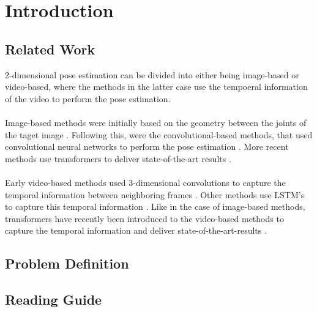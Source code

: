 \documentclass[./main.tex]{subfiles}
\begin{document}
\section{Introduction}

\subsection{Related Work}
2-dimensional pose estimation can be divided into either being image-based or video-based, where the methods in the latter case use the tempoeral information of the video to perform the pose estimation. 
\\
\\
Image-based methods were initially based on the geometry between the joints of the taget image \cite{6618926, 10.1007/978-3-642-33715-4_19, 6380498}. Following this, were the convolutional-based methods, that used convolutional neural networks \cite{lecun1995convolutional} to perform the pose estimation \cite{https://doi.org/10.48550/arxiv.1602.00134, https://doi.org/10.48550/arxiv.1603.06937, https://doi.org/10.48550/arxiv.1812.08008, https://doi.org/10.48550/arxiv.1703.06870}. More recent methods use transformers \cite{https://doi.org/10.48550/arxiv.1706.03762} to deliver state-of-the-art results \cite{https://doi.org/10.48550/arxiv.2204.12484, https://doi.org/10.48550/arxiv.2012.14214}.
\\
\\
Early video-based methods used 3-dimensional convolutions to capture the temporal information between neighboring frames \cite{https://doi.org/10.48550/arxiv.1506.02897, https://doi.org/10.48550/arxiv.1712.09184}. Other methods use LSTM's \cite{HochSchm97} to capture this temporal information \cite{https://doi.org/10.48550/arxiv.1712.06316, https://doi.org/10.48550/arxiv.2001.08095}. Like in the case of image-based methods, transformers \cite{https://doi.org/10.48550/arxiv.1706.03762} have recently been introduced to the video-based methods to capture the temporal information and deliver state-of-the-art-results \cite{https://doi.org/10.48550/arxiv.2203.08713}.

\subsection{Problem Definition}

\subsection{Reading Guide}
\end{document}
